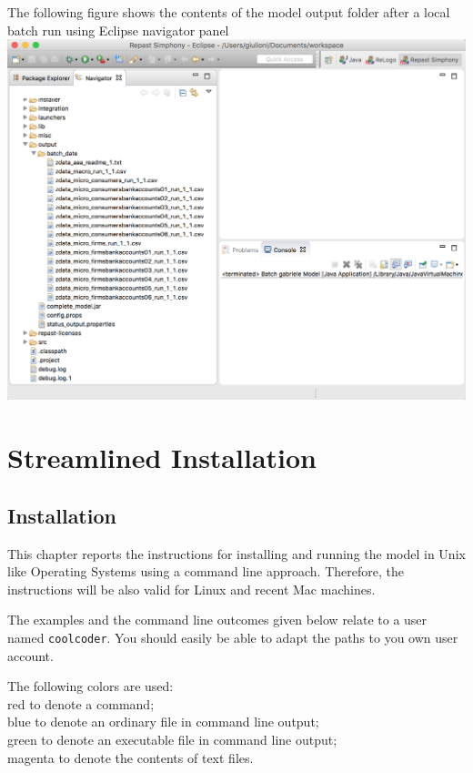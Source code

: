 \documentclass{book}
\begin{document}
The following figure shows the contents of the model output folder after a local batch run using Eclipse navigator panel\\ 
\noindent
\includegraphics[scale=0.35]{fig_gabriele_rs_batch1}


\chapter{Streamlined Installation}

\section{Installation}
This chapter reports the instructions for installing and running the model in Unix like Operating Systems using a command line approach. Therefore, the instructions will be also valid for Linux and recent Mac machines.

The examples and the command line outcomes given below relate to a user named \verb+coolcoder+. You should easily be able to adapt the paths to you own user account. 

The following colors are used:\\
\color{red}red \color{black} to denote a command;\\
\color{blue}blue \color{black} to denote an ordinary file in command line output;\\
\color{green}green \color{black} to denote an executable file in command line output;\\
\color{magenta}magenta \color{black} to denote the contents of text files.\\
\end{document}
